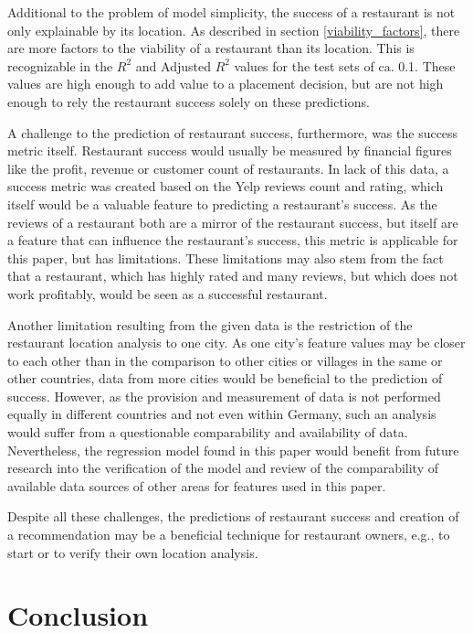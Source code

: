 \documentclass[a4paper, 11pt, oneside]{Thesis}  %
\begin{document}
Additional to the problem of model simplicity, the success of a restaurant is not only explainable by its location. As described in section \ref{viability_factors}, there are more factors to the viability of a restaurant than its location. This is recognizable in the $R^2$ and Adjusted $R^2$ values for the test sets of ca. 0.1. These values are high enough to add value to a placement decision, but are not high enough to rely the restaurant success solely on these predictions.

A challenge to the prediction of restaurant success, furthermore, was the success metric itself. Restaurant success would usually be measured by financial figures like the profit, revenue or customer count of restaurants. In lack of this data, a success metric was created based on the Yelp reviews count and rating, which itself would be a valuable feature to predicting a restaurant's success. As the reviews of a restaurant both are a mirror of the restaurant success, but itself are a feature that can influence the restaurant's success, this metric is applicable for this paper, but has limitations. These limitations may also stem from the fact that a restaurant, which has highly rated and many reviews, but which does not work profitably, would be seen as a successful restaurant.

Another limitation resulting from the given data is the restriction of the restaurant location analysis to one city. As one city's feature values may be closer to each other than in the comparison to other cities or villages in the same or other countries, data from more cities would be beneficial to the prediction of success. However, as the provision and measurement of data is not performed equally in different countries and not even within Germany, such an analysis would suffer from a questionable comparability and availability of data. Nevertheless, the regression model found in this paper would benefit from future research into the verification of the model and review of the comparability of available data sources of other areas for features used in this paper.

Despite all these challenges, the predictions of restaurant success and creation of a recommendation may be a beneficial technique for restaurant owners, e.g., to start or to verify their own location analysis.

\chapter{Conclusion}
\label{Conclusion}
\end{document}
